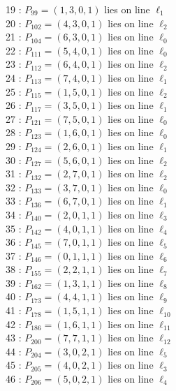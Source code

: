 \documentclass{article}
\begin{document}
{\begin{multicols}{2}
19 : $P_{99}=( 1, 3, 0, 1 )$ lies on line $\ell_{1}$\\
20 : $P_{102}=( 4, 3, 0, 1 )$ lies on line $\ell_{2}$\\
21 : $P_{104}=( 6, 3, 0, 1 )$ lies on line $\ell_{0}$\\
22 : $P_{111}=( 5, 4, 0, 1 )$ lies on line $\ell_{0}$\\
23 : $P_{112}=( 6, 4, 0, 1 )$ lies on line $\ell_{2}$\\
24 : $P_{113}=( 7, 4, 0, 1 )$ lies on line $\ell_{1}$\\
25 : $P_{115}=( 1, 5, 0, 1 )$ lies on line $\ell_{2}$\\
26 : $P_{117}=( 3, 5, 0, 1 )$ lies on line $\ell_{1}$\\
27 : $P_{121}=( 7, 5, 0, 1 )$ lies on line $\ell_{0}$\\
28 : $P_{123}=( 1, 6, 0, 1 )$ lies on line $\ell_{0}$\\
29 : $P_{124}=( 2, 6, 0, 1 )$ lies on line $\ell_{1}$\\
30 : $P_{127}=( 5, 6, 0, 1 )$ lies on line $\ell_{2}$\\
31 : $P_{132}=( 2, 7, 0, 1 )$ lies on line $\ell_{2}$\\
32 : $P_{133}=( 3, 7, 0, 1 )$ lies on line $\ell_{0}$\\
33 : $P_{136}=( 6, 7, 0, 1 )$ lies on line $\ell_{1}$\\
34 : $P_{140}=( 2, 0, 1, 1 )$ lies on line $\ell_{3}$\\
35 : $P_{142}=( 4, 0, 1, 1 )$ lies on line $\ell_{4}$\\
36 : $P_{145}=( 7, 0, 1, 1 )$ lies on line $\ell_{5}$\\
37 : $P_{146}=( 0, 1, 1, 1 )$ lies on line $\ell_{6}$\\
38 : $P_{155}=( 2, 2, 1, 1 )$ lies on line $\ell_{7}$\\
39 : $P_{162}=( 1, 3, 1, 1 )$ lies on line $\ell_{8}$\\
40 : $P_{173}=( 4, 4, 1, 1 )$ lies on line $\ell_{9}$\\
41 : $P_{178}=( 1, 5, 1, 1 )$ lies on line $\ell_{10}$\\
42 : $P_{186}=( 1, 6, 1, 1 )$ lies on line $\ell_{11}$\\
43 : $P_{200}=( 7, 7, 1, 1 )$ lies on line $\ell_{12}$\\
44 : $P_{204}=( 3, 0, 2, 1 )$ lies on line $\ell_{5}$\\
45 : $P_{205}=( 4, 0, 2, 1 )$ lies on line $\ell_{3}$\\
46 : $P_{206}=( 5, 0, 2, 1 )$ lies on line $\ell_{4}$\\

\end{multicols}}
\end{document}
